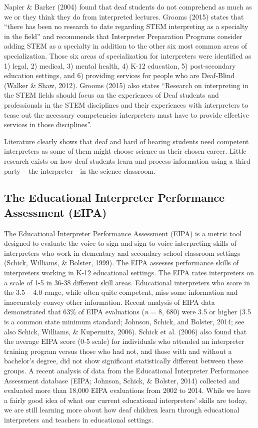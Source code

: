 \documentclass[11.5pt]{sig-alternate} %
\begin{document}
\begin{large}
Napier \& Barker (2004) found that deaf students do not comprehend as much as we or they think they do from interpreted lectures. Grooms (2015) states that “there has been no research to date regarding STEM interpreting as a specialty in the field” and recommends that Interpreter Preparation Programs consider adding STEM as a specialty in addition to the other six most common areas of specialization. Those six areas of specialization for interpreters were identified as 1) legal, 2) medical, 3) mental health, 4) K-12 education, 5) post-secondary education settings, and 6) providing services for people who are Deaf-Blind (Walker \& Shaw, 2012). Grooms (2015) also states “Research on interpreting in the STEM fields should focus on the experiences of Deaf students and professionals in the STEM disciplines and their experiences with interpreters to tease out the necessary competencies interpreters must have to provide effective services in those disciplines”.

Literature clearly shows that deaf and hard of hearing students need competent interpreters as some of them might choose science as their chosen career. Little research exists on how deaf students learn and process information using a third party – the interpreter—in the science classroom. 

\subsection*{The Educational Interpreter Performance Assessment (EIPA)}

The Educational Interpreter Performance Assessment (EIPA) is a metric tool designed to evaluate the voice-to-sign and sign-to-voice interpreting skills of interpreters who work in elementary and secondary school classroom settings (Schick, Williams, \& Bolster, 1999). The EIPA assesses performance skills of interpreters working in K-12 educational settings. The EIPA rates interpreters on a scale of 1-5 in 36-38 different skill areas. Educational interpreters who score in the 3.5 – 4.0 range, while often quite competent, miss some information and inaccurately convey other information. Recent analysis of EIPA data demonstrated that 63\% of EIPA evaluations (\textit{n} = 8, 680) were 3.5 or higher (3.5 is a common state minimum standard; Johnson, Schick, and Bolster, 2014; see also Schick, Williams, \& Kupermitz, 2006). Schick et al. (2006) also found that the average EIPA score (0-5 scale) for individuals who attended an interpreter training program versus those who had not, and those with and without a bachelor’s degree, did not show significant statistically different between these groups. A recent analysis of data from the Educational Interpreter Performance Assessment database (EIPA; Johnson, Schick, \& Bolster, 2014) collected and evaluated more than 18,000 EIPA evaluations from 2002 to 2014. While we have a fairly good idea of what our current educational interpreters’ skills are today, we are still learning more about how deaf children learn through educational interpreters and teachers in educational settings.


\end{large}
\end{document}
